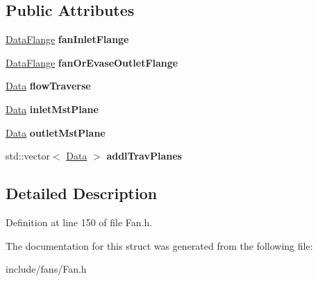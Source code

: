 \subsection*{Public Attributes}
\begin{DoxyCompactItemize}
\item 
\mbox{\label{struct_plane_data_1_1_node_binding_1_1_output_a1e03cb2e19c2b0284f75df5cdf065675}} 
\hyperlink{struct_plane_data_1_1_node_binding_1_1_data_flange}{Data\+Flange} {\bfseries fan\+Inlet\+Flange}
\item 
\mbox{\label{struct_plane_data_1_1_node_binding_1_1_output_af07f4acd58bb66b2c9c1b887427d2fbb}} 
\hyperlink{struct_plane_data_1_1_node_binding_1_1_data_flange}{Data\+Flange} {\bfseries fan\+Or\+Evase\+Outlet\+Flange}
\item 
\mbox{\label{struct_plane_data_1_1_node_binding_1_1_output_a5dfaab5fc6ebed9f699191eb3903a97e}} 
\hyperlink{struct_plane_data_1_1_node_binding_1_1_data}{Data} {\bfseries flow\+Traverse}
\item 
\mbox{\label{struct_plane_data_1_1_node_binding_1_1_output_afdb50efd9bba21241d822a10cc8b804c}} 
\hyperlink{struct_plane_data_1_1_node_binding_1_1_data}{Data} {\bfseries inlet\+Mst\+Plane}
\item 
\mbox{\label{struct_plane_data_1_1_node_binding_1_1_output_a7ca28948b57ea956833151a20f446ea1}} 
\hyperlink{struct_plane_data_1_1_node_binding_1_1_data}{Data} {\bfseries outlet\+Mst\+Plane}
\item 
\mbox{\label{struct_plane_data_1_1_node_binding_1_1_output_ab64773261d9acfc19e212f8afb85d6b4}} 
std\+::vector$<$ \hyperlink{struct_plane_data_1_1_node_binding_1_1_data}{Data} $>$ {\bfseries addl\+Trav\+Planes}
\end{DoxyCompactItemize}


\subsection{Detailed Description}


Definition at line 150 of file Fan.\+h.



The documentation for this struct was generated from the following file\+:\begin{DoxyCompactItemize}
\item 
include/fans/Fan.\+h\end{DoxyCompactItemize}
